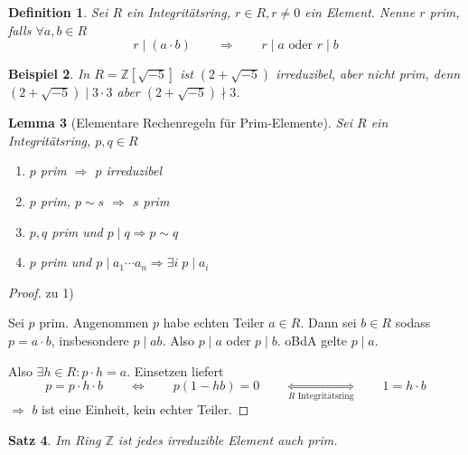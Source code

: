 \documentclass[a4paper,12pt,numbers=noenddot,parskip=full]{scrartcl}
\newcommand{\setZ}{\mathbb{Z}}
\theoremstyle{dotless}
\newtheorem{theorem}{Satz}[section]
\newtheorem{lemma}[theorem]{Lemma}
\newtheorem{definition}[theorem]{Definition}
\newtheorem{example}[theorem]{Beispiel}
\theoremstyle{remark}
\begin{document}
	\begin{definition}
		Sei $R$ ein Integritätsring, $r \in R, r \neq 0$ ein Element. Nenne $r$ prim, falls $\forall a,b \in R$
		\begin{equation*}
			r \mid (a \cdot b) \qquad \Longrightarrow \qquad r \mid a \text{ oder } r \mid b
		\end{equation*}
	\end{definition}

	\begin{example}
		In $R = \setZ[\sqrt{-5}]$ ist $(2 + \sqrt{-5})$ irreduzibel, aber  nicht prim, denn $(2 + \sqrt{-5}) \mid 3 \cdot 3$ aber $(2 + \sqrt{-5}) \nmid 3$.
	\end{example}

	\begin{lemma}[Elementare Rechenregeln für Prim-Elemente]
		Sei $R$ ein Integritätsring, $p,q \in R$
		\begin{enumerate}
			\item $p$ prim $\Rightarrow$ $p$ irreduzibel
			\item $p$ prim, $p \sim s$ $\Rightarrow$ $s$ prim
			\item $p,q$ prim und $p \mid q \Rightarrow p \sim q$
			\item $p$ prim und $p \mid a_1 \cdots a_n \Rightarrow \exists i \; p \mid a_i$
		\end{enumerate}
	\end{lemma}

	\begin{proof}
		zu 1)
		
		Sei $p$ prim. Angenommen $p$ habe echten Teiler $a \in R$. Dann sei $b \in R$ sodass $p = a \cdot b$, insbesondere $p \mid ab$. Also $p \mid a$ oder $p \mid b$. oBdA gelte $p \mid a$.
		
		Also $\exists h \in R : p \cdot h = a$. Einsetzen liefert
		\begin{equation*}
			p = p \cdot h \cdot b \qquad \Longleftrightarrow \qquad p(1-hb) = 0 \qquad \underset{\text{$R$ Integritätsring}}{\Longleftrightarrow} \qquad 1 = h \cdot b
		\end{equation*}
		$\Rightarrow$ $b$ ist eine Einheit, kein echter Teiler.
	\end{proof}

	\begin{theorem}
		Im Ring $\setZ$ ist jedes irreduzible Element auch prim.
	\end{theorem}
\end{document}
